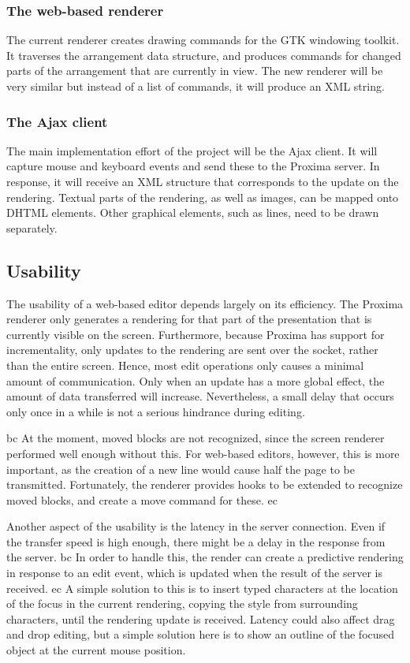 \documentclass[10pt]{article}
\begin{document}
\subsubsection{The web-based renderer}

The current renderer creates drawing commands for the GTK windowing toolkit. It traverses the arrangement data structure, and produces commands for changed parts of the arrangement that are currently in view. The new renderer will be very similar but instead of a list of commands, it will produce an XML string.

\subsubsection{The Ajax client}

The main implementation effort of the project will be the Ajax client. It will capture mouse and keyboard events and send these to the Proxima server. In response, it will receive an XML structure that corresponds to the update on the rendering. Textual parts of the rendering, as well as images, can be mapped onto DHTML elements. Other graphical elements, such as lines, need to be drawn separately.

\bc
\subsection{Usability}

The usability of a web-based editor depends largely on its efficiency. The Proxima renderer only generates a rendering for that part of the presentation that is currently visible on the screen. Furthermore, because Proxima has support for incrementality, only updates to the rendering are sent over the socket, rather than the entire screen. Hence, most edit operations only causes a minimal amount of communication. Only when an update has a more global effect, the amount of data transferred will increase. Nevertheless, a small delay that occurs only once in a while is not a serious hindrance during editing. 

bc
At the moment, moved blocks are not recognized, since the screen renderer performed well enough without this. For web-based editors, however, this is more important, as the creation of a new line would cause half the page to be transmitted. Fortunately, the renderer provides hooks to be extended to recognize moved blocks, and create a move command for these.
ec

Another aspect of the usability is the latency in the server connection. Even if the transfer speed is high enough, there might be a delay in the response from the server. bc 
In order to handle this, the render can create a predictive rendering in response to an edit event, which is updated when the result of the server is received.
ec
A simple solution to this is to insert typed characters at the location of the focus in the current rendering, copying the style from surrounding characters, until the rendering update is received. Latency could also affect drag and drop editing, but a simple solution here is to show an outline of the focused object at the current mouse position. 
\end{document}
